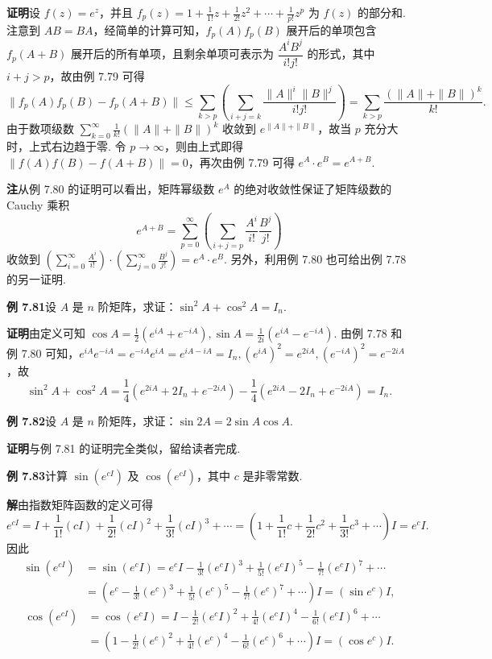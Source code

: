 \documentclass[UTF8,12pt,a4paper,fontset=fandol]{ctexart}
\begin{document}
\noindent\textbf{证明}\quad 设 $f(z)=e^z$，并且 $f_p(z)=1+\frac1{1!}z+\frac1{2!}z^2+\cdots+\frac1{p!}z^p$ 为 $f(z)$ 的部分和. 注意到 $AB=BA$，经简单的计算可知，$f_p(A)f_p(B)$ 展开后的单项包含 $f_p(A+B)$ 展开后的所有单项，且剩余单项可表示为 $\dfrac{A^iB^j}{i!j!}$ 的形式，其中 $i+j>p$，故由例 7.79 可得
\[
\|f_p(A)f_p(B)-f_p(A+B)\|\le\sum_{k>p}\left(\sum_{i+j=k}\frac{\|A\|^i\|B\|^j}{i!j!}\right)=\sum_{k>p}\frac{(\|A\|+\|B\|)^k}{k!}.
\]
由于数项级数 $\sum_{k=0}^{\infty}\frac1{k!}(\|A\|+\|B\|)^k$ 收敛到 $e^{\|A\|+\|B\|}$，故当 $p$ 充分大时，上式右边趋于零. 令 $p\to\infty$，则由上式即得 $\|f(A)f(B)-f(A+B)\|=0$，再次由例 7.79 可得 $e^A\cdot e^B=e^{A+B}$.

\noindent\textbf{注}\quad 从例 7.80 的证明可以看出，矩阵幂级数 $e^A$ 的绝对收敛性保证了矩阵级数的 Cauchy 乘积
\[
e^{A+B}=\sum_{p=0}^{\infty}\left(\sum_{i+j=p}\frac{A^i}{i!}\frac{B^j}{j!}\right)
\]
收敛到 $\left(\sum_{i=0}^{\infty}\frac{A^i}{i!}\right)\cdot\left(\sum_{j=0}^{\infty}\frac{B^j}{j!}\right)=e^A\cdot e^B$. 另外，利用例 7.80 也可给出例 7.78 的另一证明.

\noindent\textbf{例 7.81}\quad 设 $A$ 是 $n$ 阶矩阵，求证：$\sin^2A+\cos^2A=I_n$.

\noindent\textbf{证明}\quad 由定义可知 $\cos A=\frac12(e^{iA}+e^{-iA}),\sin A=\frac1{2i}(e^{iA}-e^{-iA})$. 由例 7.78 和例 7.80 可知，$e^{iA}e^{-iA}=e^{-iA}e^{iA}=e^{iA-iA}=I_n,(e^{iA})^2=e^{2iA},(e^{-iA})^2=e^{-2iA}$，故
\[
\sin^2A+\cos^2A=\frac14(e^{2iA}+2I_n+e^{-2iA})-\frac14(e^{2iA}-2I_n+e^{-2iA})=I_n.
\]

\noindent\textbf{例 7.82}\quad 设 $A$ 是 $n$ 阶矩阵，求证：$\sin2A=2\sin A\cos A$.

\noindent\textbf{证明}\quad 与例 7.81 的证明完全类似，留给读者完成.

\noindent\textbf{例 7.83}\quad 计算 $\sin(e^{cI})$ 及 $\cos(e^{cI})$，其中 $c$ 是非零常数.

\noindent\textbf{解}\quad 由指数矩阵函数的定义可得
\[
e^{cI}=I+\frac1{1!}(cI)+\frac1{2!}(cI)^2+\frac1{3!}(cI)^3+\cdots
=\left(1+\frac1{1!}c+\frac1{2!}c^2+\frac1{3!}c^3+\cdots\right)I=e^cI.
\]
因此
\[
\begin{aligned}
\sin(e^{cI})&=\sin(e^cI)=e^cI-\frac1{3!}(e^cI)^3+\frac1{5!}(e^cI)^5-\frac1{7!}(e^cI)^7+\cdots\\
&=\left(e^c-\frac1{3!}(e^c)^3+\frac1{5!}(e^c)^5-\frac1{7!}(e^c)^7+\cdots\right)I=(\sin e^c)I,
\end{aligned}
\]
\[
\begin{aligned}
\cos(e^{cI})&=\cos(e^cI)=I-\frac1{2!}(e^cI)^2+\frac1{4!}(e^cI)^4-\frac1{6!}(e^cI)^6+\cdots\\
&=\left(1-\frac1{2!}(e^c)^2+\frac1{4!}(e^c)^4-\frac1{6!}(e^c)^6+\cdots\right)I=(\cos e^c)I.
\end{aligned}
\]
\end{document}
